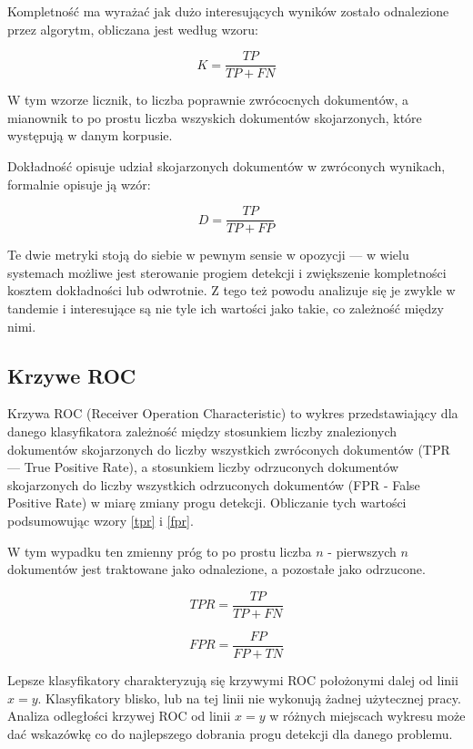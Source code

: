 \documentclass[11pt,a4paper]{article}
\begin{document}
Kompletność ma wyrażać jak dużo interesujących wyników zostało odnalezione przez
algorytm, obliczana jest według wzoru:

\begin{equation}
  K = \frac{TP}{TP + FN}
\end{equation}

W tym wzorze licznik, to liczba poprawnie zwrócocnych dokumentów, a mianownik
to po prostu liczba wszyskich dokumentów skojarzonych, które występują w danym
korpusie.

Dokładność opisuje udział skojarzonych dokumentów w zwróconych wynikach, formalnie
opisuje ją wzór:

\begin{equation}
  D = \frac{TP}{TP + FP}
\end{equation}

Te dwie metryki stoją do siebie w pewnym sensie w opozycji --- w wielu
systemach możliwe jest sterowanie progiem detekcji i zwiększenie kompletności
kosztem dokładności lub odwrotnie. Z tego też powodu analizuje się je zwykle w
tandemie i interesujące są nie tyle ich wartości jako takie, co zależność
między nimi.

\subsection{Krzywe ROC}

Krzywa ROC \cite{roc-article1} (Receiver Operation Characteristic) to wykres
przedstawiający dla danego klasyfikatora zależność między stosunkiem liczby
znalezionych dokumentów skojarzonych do liczby wszystkich zwróconych dokumentów
(TPR --- True Positive Rate), a stosunkiem liczby odrzuconych dokumentów
skojarzonych do liczby wszystkich odrzuconych dokumentów (FPR - False Positive
Rate) w miarę zmiany progu detekcji. Obliczanie tych wartości podsumowując
wzory \ref{tpr} i \ref{fpr}.

W tym wypadku ten zmienny próg to po prostu liczba $n$ - pierwszych $n$
dokumentów jest traktowane jako odnalezione, a pozostałe jako odrzucone.

\begin{equation}
\label{tpr}
TPR = \frac{TP}{TP + FN}
\end{equation}

\begin{equation}
\label{fpr}
FPR = \frac{FP}{FP + TN}
\end{equation}

Lepsze klasyfikatory charakteryzują się krzywymi ROC położonymi dalej od linii
$x = y$.  Klasyfikatory blisko, lub na tej linii nie wykonują żadnej użytecznej
pracy. Analiza odległości krzywej ROC od linii $x = y$ w różnych miejscach
wykresu może dać wskazówkę co do najlepszego dobrania progu detekcji dla danego
problemu.
\end{document}
